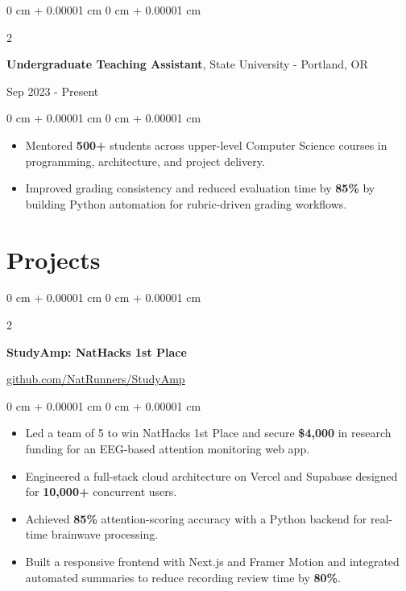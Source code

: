 \documentclass[10pt, letterpaper]{article}
\newenvironment{onecolentry}{
    \begin{adjustwidth}{
        0 cm + 0.00001 cm
    }{
        0 cm + 0.00001 cm
    }
}{
    \end{adjustwidth}
}
\newenvironment{twocolentry}[2][]{
    \onecolentry
    \def\secondColumn{#2}
    \setcolumnwidth{\fill, 6 cm}
    \begin{paracol}{2}
}{
    \switchcolumn \raggedleft \secondColumn
    \end{paracol}
    \endonecolentry
}
\begin{document}
    \vspace{0.10 cm}

    \begin{twocolentry}{Sep 2023 - Present}
        \textbf{Undergraduate Teaching Assistant}, State University - Portland, OR
    \end{twocolentry}

   \vspace{0.10 cm}
    \begin{onecolentry}
        \begin{itemize}[leftmargin=2em, itemsep=1pt, parsep=0pt, topsep=0pt, partopsep=0pt]
            \item Mentored \textbf{500+} students across upper-level Computer Science courses in programming, architecture, and project delivery.
            \item Improved grading consistency and reduced evaluation time by \textbf{85\%} by building Python automation for rubric-driven grading workflows.
        \end{itemize}
    \end{onecolentry}
    
    \vspace{0.10 cm}
    \section{Projects}

    \begin{twocolentry}{\href{https://github.com/NatRunners/StudyAmp}{github.com/NatRunners/StudyAmp}}
        \textbf{StudyAmp: NatHacks 1st Place}
    \end{twocolentry}

    \vspace{0.10 cm}
    \begin{onecolentry}
        \begin{itemize}[leftmargin=2em, itemsep=1pt, parsep=0pt, topsep=0pt, partopsep=0pt]
            \item Led a team of 5 to win NatHacks 1st Place and secure \textbf{\$4,000} in research funding for an EEG-based attention monitoring web app.
            \item Engineered a full-stack cloud architecture on Vercel and Supabase designed for \textbf{10,000+} concurrent users.
            \item Achieved \textbf{85\%} attention-scoring accuracy with a Python backend for real-time brainwave processing.
            \item Built a responsive frontend with Next.js and Framer Motion and integrated automated summaries to reduce recording review time by \textbf{80\%}.
        \end{itemize}
    \end{onecolentry}
    
\end{document}
